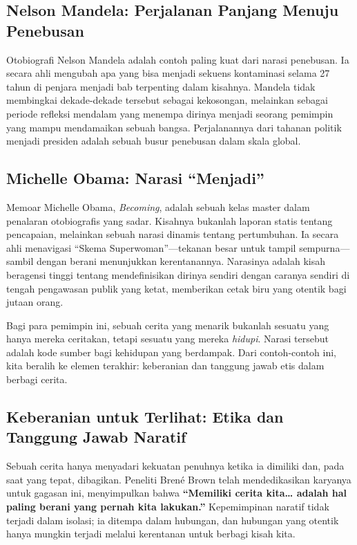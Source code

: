 \documentclass[
  letterpaper,
  DIV=11,
  numbers=noendperiod]{scrreprt}
\begin{document}
\subsection{Nelson Mandela: Perjalanan Panjang Menuju
Penebusan}\label{nelson-mandela-perjalanan-panjang-menuju-penebusan}

Otobiografi Nelson Mandela adalah contoh paling kuat dari narasi
penebusan. Ia secara ahli mengubah apa yang bisa menjadi sekuens
kontaminasi selama 27 tahun di penjara menjadi bab terpenting dalam
kisahnya. Mandela tidak membingkai dekade-dekade tersebut sebagai
kekosongan, melainkan sebagai periode refleksi mendalam yang menempa
dirinya menjadi seorang pemimpin yang mampu mendamaikan sebuah bangsa.
Perjalanannya dari tahanan politik menjadi presiden adalah sebuah busur
penebusan dalam skala global.

\subsection{Michelle Obama: Narasi
``Menjadi''}\label{michelle-obama-narasi-menjadi}

Memoar Michelle Obama, \emph{Becoming}, adalah sebuah kelas master dalam
penalaran otobiografis yang sadar. Kisahnya bukanlah laporan statis
tentang pencapaian, melainkan sebuah narasi dinamis tentang pertumbuhan.
Ia secara ahli menavigasi ``Skema Superwoman''---tekanan besar untuk
tampil sempurna---sambil dengan berani menunjukkan kerentanannya.
Narasinya adalah kisah beragensi tinggi tentang mendefinisikan dirinya
sendiri dengan caranya sendiri di tengah pengawasan publik yang ketat,
memberikan cetak biru yang otentik bagi jutaan orang.

Bagi para pemimpin ini, sebuah cerita yang menarik bukanlah sesuatu yang
hanya mereka ceritakan, tetapi sesuatu yang mereka \emph{hidupi}. Narasi
tersebut adalah kode sumber bagi kehidupan yang berdampak. Dari
contoh-contoh ini, kita beralih ke elemen terakhir: keberanian dan
tanggung jawab etis dalam berbagi cerita.

\subsection{Keberanian untuk Terlihat: Etika dan Tanggung Jawab
Naratif}\label{keberanian-untuk-terlihat-etika-dan-tanggung-jawab-naratif}

Sebuah cerita hanya menyadari kekuatan penuhnya ketika ia dimiliki dan,
pada saat yang tepat, dibagikan. Peneliti Brené Brown telah
mendedikasikan karyanya untuk gagasan ini, menyimpulkan bahwa
\textbf{``Memiliki cerita kita\ldots{} adalah hal paling berani yang
pernah kita lakukan.''} Kepemimpinan naratif tidak terjadi dalam
isolasi; ia ditempa dalam hubungan, dan hubungan yang otentik hanya
mungkin terjadi melalui kerentanan untuk berbagi kisah kita.
\end{document}
